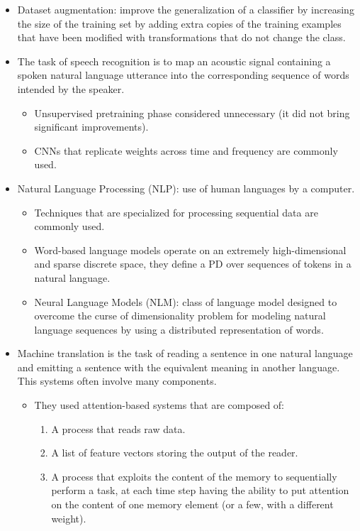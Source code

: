 \documentclass{article}
\begin{document}
\begin{itemize}
\item Dataset augmentation: improve the generalization of a classifier by increasing the size of the training set by adding extra copies of the training examples that have been modified with transformations that do not change the class.
\item The task of speech recognition is to map an acoustic signal containing a spoken natural language utterance into the corresponding sequence of words intended by the speaker. 
\begin{itemize}
\item Unsupervised pretraining phase considered unnecessary (it did not bring significant improvements).
\item CNNs that replicate weights across time and frequency are commonly used.
\end{itemize}
\item Natural Language Processing (NLP): use of human languages by a computer.
\begin{itemize}
\item Techniques that are specialized for processing sequential data are commonly used.
\item Word-based language models operate on an extremely high-dimensional and sparse discrete space, they define a PD over sequences of tokens in a natural language.
\item Neural Language Models (NLM): class of language model designed to overcome the curse of dimensionality problem for modeling natural language sequences by using a distributed representation of words.
\end{itemize}
\item Machine translation is the task of reading a sentence in one natural language and emitting a sentence with the equivalent meaning in another language. This systems often involve many components.
\begin{itemize}
\item They used attention-based systems that are composed of:
\begin{enumerate}
\item A process that reads raw data.
\item A list of feature vectors storing the output of the reader.
\item A process that exploits the content of the memory to sequentially perform a task, at each time step having the ability to put attention on the content of one memory element (or a few, with a different weight).
\end{enumerate}

\end{itemize}
\end{itemize}
\end{document}
